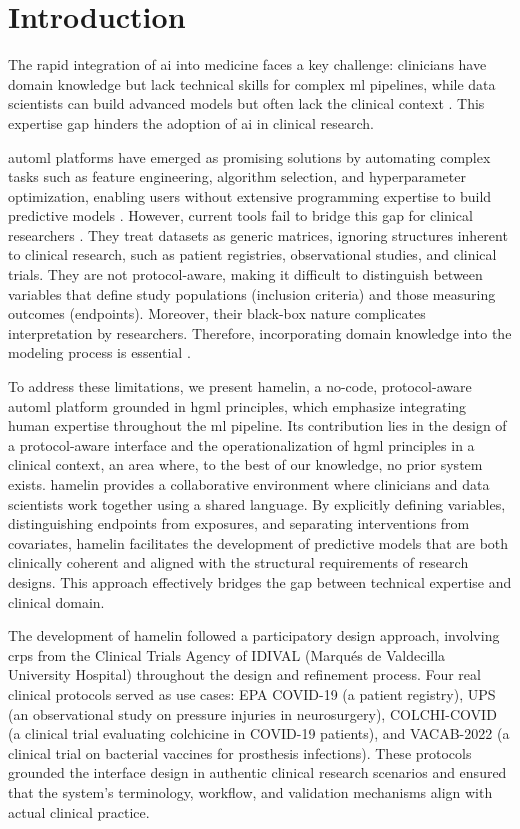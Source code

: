 \section{Introduction}
\label{sec:introduction}

The rapid integration of \gls{ai} into medicine faces a key challenge: clinicians have domain knowledge but lack technical skills for complex \gls{ml} pipelines, while data scientists can build advanced models but often lack the clinical context \cite{gisselbaek2025bridging}. This expertise gap hinders the adoption of \gls{ai} in clinical research.

\Gls{automl} platforms have emerged as promising solutions by automating complex tasks such as feature engineering, algorithm selection, and hyperparameter optimization, enabling users without extensive programming expertise to build predictive models \cite{karmaker2021automl}. However, current tools fail to bridge this gap for clinical researchers \cite{waring2020automated}. They treat datasets as generic matrices, ignoring structures inherent to clinical research, such as patient registries, observational studies, and clinical trials. They are not protocol-aware, making it difficult to distinguish between variables that define study populations (inclusion criteria) and those measuring outcomes (endpoints). Moreover, their black-box nature complicates interpretation by researchers. Therefore, incorporating domain knowledge into the modeling process is essential \cite{sirocchi2024medical}.

To address these limitations, we present \gls{hamelin}, a no-code, protocol-aware \gls{automl} platform grounded in \gls{hgml} principles, which emphasize integrating human expertise throughout the \gls{ml} pipeline. Its contribution lies in the design of a protocol-aware interface and the operationalization of \gls{hgml} principles in a clinical context, an area where, to the best of our knowledge, no prior system exists. \gls{hamelin} provides a collaborative environment where clinicians and data scientists work together using a shared language. By explicitly defining variables, distinguishing endpoints from exposures, and separating interventions from covariates, \gls{hamelin} facilitates the development of predictive models that are both clinically coherent and aligned with the structural requirements of research designs. This approach effectively bridges the gap between technical expertise and clinical domain.

The development of \gls{hamelin} followed a participatory design approach, involving \glspl{crp} from the Clinical Trials Agency of IDIVAL (Marqu\'es de Valdecilla University Hospital) throughout the design and refinement process. Four real clinical protocols served as use cases: EPA COVID-19 (a patient registry), UPS (an observational study on pressure injuries in neurosurgery), COLCHI-COVID (a clinical trial evaluating colchicine in COVID-19 patients), and VACAB-2022 (a clinical trial on bacterial vaccines for prosthesis infections). These protocols grounded the interface design in authentic clinical research scenarios and ensured that the system's terminology, workflow, and validation mechanisms align with actual clinical practice.

